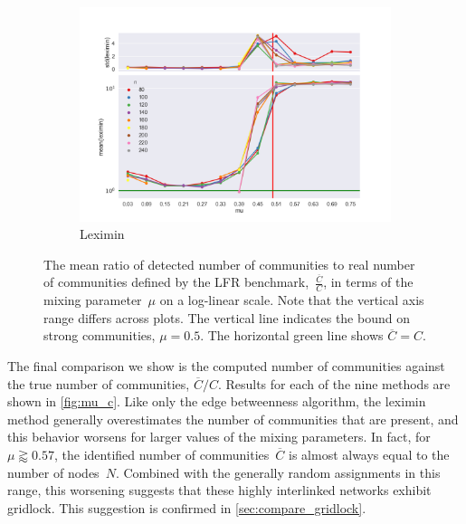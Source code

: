 \begin{figure}
    \begin{subfigure}[b]{0.32\textwidth}
        \includegraphics[width=\textwidth]{fig/ratio_vs_mu_leximin}
        \caption{Leximin}
        \label{fig:mouse}
    \end{subfigure}

  \caption{The mean ratio of detected number of communities to real number of communities defined by the LFR benchmark,~$\frac{\overline{C}}{C}$, in terms of the mixing parameter~$\mu$ on a log-linear scale. Note that the vertical axis range differs across plots. The vertical line indicates the bound on strong communities, $\mu = 0.5$. The horizontal green line shows $\overline{C} = C$.}
  \label{fig:mu_c}
\end{figure}

The final comparison we show is the computed number of communities against the true number of communities, $\overline{C}/C$. Results for each of the nine methods are shown in \autoref{fig:mu_c}. Like only the edge betweenness algorithm, the leximin method generally overestimates the number of communities that are present, and this behavior worsens for larger values of the mixing parameters. In fact, for $\mu \gtrapprox 0.57$, the identified number of communities~$\overline{C}$ is almost always equal to the number of nodes~$N$. Combined with the generally random assignments in this range, this worsening suggests that these highly interlinked networks exhibit gridlock. This suggestion is confirmed in \autoref{sec:compare_gridlock}.



